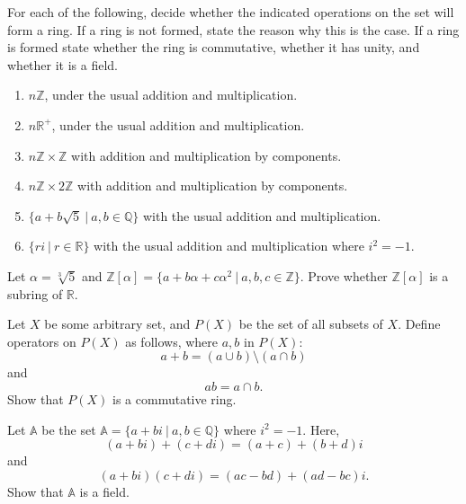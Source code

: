 \begin{mdframed}
    \vspace{-0.25cm}
    \hspace{-0.25cm}
    \begin{Exercise}
        For each of the following, decide whether the indicated operations on the set will form a ring. If a ring is not formed, 
        state the reason why this is the case. If a ring is formed state whether the ring is commutative, whether it has unity, 
        and whether it is a field. 
        \begin{enumerate}
            \item $n\mathbb{Z}$, under the usual addition and multiplication.
            \item $n\mathbb{R}^+$, under the usual addition and multiplication.
            \item $n\mathbb{Z} \times \mathbb{Z}$ with addition and multiplication by components.
            \item $n\mathbb{Z} \times 2\mathbb{Z}$ with addition and multiplication by components.
            \item $\{ a + b\sqrt{5} \> | \> a,b \in \mathbb{Q} \}$ with the usual addition and multiplication.
            \item $\{ ri \> | \> r \in \mathbb{R} \}$ with the usual addition and multiplication where $i^2 = -1$.
        \end{enumerate}
    \end{Exercise}

    \vspace{0.752cm}
    \begin{Exercise}
        Let $\alpha = \sqrt[3]{5}$ and $\mathbb{Z}[\alpha] = \{ a + b\alpha + c\alpha^2 \> | \> a,b,c \in \mathbb{Z} \}$. Prove whether 
        $\mathbb{Z}[\alpha]$ is a subring of $\mathbb{R}$.
    \end{Exercise}

    \vspace{0.752cm}
    \begin{Exercise}
        Let $X$ be some arbitrary set, and $P(X)$ be the set of all subsets of $X$. Define operators on $P(X)$ as follows, 
        where $a,b$ in $P(X)$:
        \[
            a + b = (a \cup b) \setminus (a \cap b)
        \]
        and 
        \[
            ab = a \cap b.
        \]
        Show that $P(X)$ is a commutative ring.
    \end{Exercise}

    \vspace{0.752cm}
    \begin{Exercise}
        Let $\mathbb{A}$ be the set $\mathbb{A} = \{ a + bi \> | \> a, b \in \mathbb{Q} \}$
        where $i^2 = -1$. Here,
        \[
            (a + bi) + (c + di) = (a + c) + (b+d)i
        \] 
        and 
        \[
            (a+bi)(c+di) = (ac-bd) + (ad - bc)i.
        \]
        Show that $\mathbb{A}$ is a field.
    \end{Exercise}


\end{mdframed}
